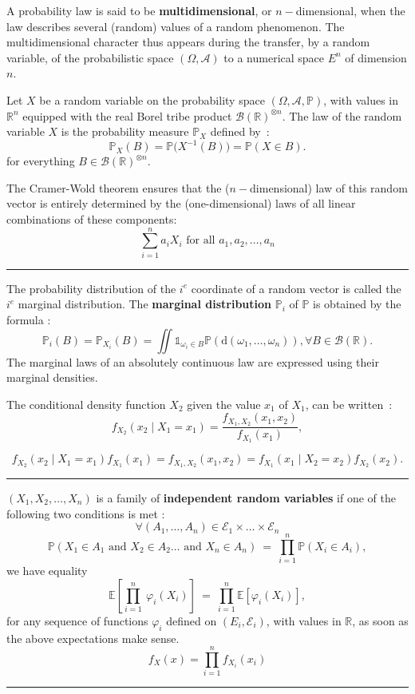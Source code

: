 \begin{f}
			
			
A probability law is said to be \textbf{multidimensional}, or $n-$dimensional, when the law describes several (random) values of a random phenomenon.
The multidimensional character thus appears during the transfer, by a random variable, of the probabilistic space $(\Omega,\mathcal{A})$ to a numerical space $E^n$ of dimension $n$.

Let $X$ be a random variable on the probability space $(\Omega, \mathcal A, \mathbb{P})$, with values in ${\mathbb{R}}^n$ equipped with the real Borel tribe product ${\mathcal {B}(\mathbb{R})}^{\otimes n}$.
The law of the random variable $X$ is the probability measure $\mathbb{P}_X$ defined by~:
$$
\mathbb{P}_X(B) = \mathbb{P}\big(X^{-1}(B)\big) = \mathbb{P}(X \in B).
$$
for everything $B \in {\mathcal B(\mathbb R)}^{\otimes n}$.

The Cramer-Wold theorem ensures that the ($n-$dimensional) law of this random vector is entirely determined by the (one-dimensional) laws of all linear combinations of these components:
$$\sum_{i = 1}^n a_i X_i\mbox{ for all }a_1, a_2, \dots, a_n$$


\end{f}
\hrule

\begin{f}
The probability distribution of the $i^e$ coordinate of a random vector is called the $i^e$ marginal distribution. The \textbf{marginal distribution} $\mathbb{P}_i$ of $\mathbb{P}$ is obtained by the formula :
$$
\mathbb{P}_i(B) = \mathbb{P}_{X_i}(B) = \iint { \mathds{1}}_{\omega_i\in B} \mathbb{P}(\mathrm{d}(\omega_1,\dots,\omega_n)), \forall  B \in \mathcal B(\mathbb{R}).
$$
The marginal laws of an absolutely continuous law are expressed using their marginal densities.


The conditional density function $X_2$ given the value $x_1$ of $X_1$, can be written~:
$$
f_{X_2}(x_2 \mid X_1=x_1) = \frac{f_{X_1, X_2}(x_1,x_2)}{f_{X_1}(x_1)}, 
$$

$$
f_{X_2}(x_2 \mid X_1=x_1)f_{X_1}(x_1) = f_{X_1,X_2}(x_1, x_2) = f_{X_1}(x_1 \mid X_2=x_2)f_{X_2}(x_2). 
$$
\end{f}
\hrule

	\begin{f}[Independence]
$(X_1, X_2, \dots,X_n)$ is a family of \textbf{independent random variables} if one of the following two conditions is met :
$$
\forall (A_1,\dots,A_n)\in\mathcal{E}_1\times\dots\times\mathcal{E}_n
$$
$$
\mathbb{P}(X_1\in A_1\text{ and }X_2\in A_2\dots\text{ and }X_n\in A_n)\ =\ \prod_{i=1}^n\mathbb{P}(X_i\in A_i),
$$
we have equality
$$
\mathbb{E}\left[\prod_{i=1}^n\ \varphi_i(X_i)\right]\ =\ \prod_{i=1}^n\mathbb{E}\left[\varphi_i(X_i)\right],
$$
for any sequence of functions $\varphi_i$ defined on $(E_i,\mathcal{E}_i)$, with values in $\mathbb{R}$, as soon as the above expectations make sense.
$$
f_X(x)= \prod_{i=1}^{n}f_{X_i}(x_i)
$$
\end{f}
\hrule



